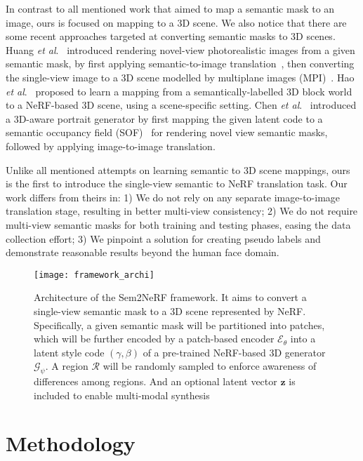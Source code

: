 \documentclass[runningheads]{llncs}
\newcommand{\etal}{\textit{et al}.}
\begin{document}
In contrast to all mentioned work that aimed to map a semantic mask to an image, ours is focused on mapping to a 3D scene.
We also notice that there are some recent approaches targeted at converting semantic masks to 3D scenes. Huang \etal~\cite{huang2020semantic} introduced rendering novel-view photorealistic images from a given semantic mask, by first applying semantic-to-image translation~\cite{park2019semantic}, then converting the single-view image to a 3D scene modelled by multiplane images (MPI)~\cite{zhou2018stereo}.
Hao \etal~\cite{hao2021gancraft} proposed to learn a mapping from a semantically-labelled 3D block world to a NeRF-based 3D scene, using a scene-specific setting. Chen \etal~\cite{chen2022sofgan} introduced a 3D-aware portrait generator by first mapping the given latent code to a semantic occupancy field (SOF)~\cite{chen2019learning} for rendering novel view semantic masks, followed by applying image-to-image translation. 

Unlike all mentioned attempts on learning semantic to 3D scene mappings, ours is the first to introduce the single-view semantic to NeRF translation task. Our work differs from theirs in: 1) We do not rely on any separate image-to-image translation stage, resulting in better multi-view consistency; 2) We do not require multi-view semantic masks for both training and testing phases, easing the data collection effort; 3) We pinpoint a solution for creating pseudo labels and demonstrate reasonable results beyond the human face domain.  




\begin{figure}[t!]
    \centering
    \texttt{[image: framework\_archi]}
    \caption{Architecture of the Sem2NeRF framework. It aims to convert a single-view semantic mask to a 3D scene represented by NeRF. Specifically, a given semantic mask will be partitioned into patches, which will be further encoded by a patch-based encoder $\mathcal{E}_\theta$ into a latent style code $(\gamma,\beta)$ of a pre-trained NeRF-based 3D generator $\mathcal{G}_\psi$. A region $\mathcal{R}$ will be randomly sampled to enforce awareness of differences among regions. And an optional latent vector $\mathbf{z}$ is included to enable multi-modal synthesis
    }
    \label{fig:framework_archi}
\end{figure}

\section{Methodology}
\end{document}
